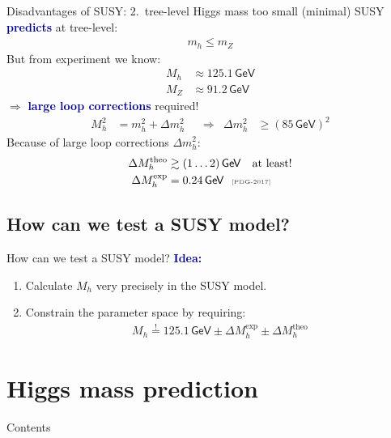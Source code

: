 \documentclass[hyperref={pdfpagelabels=false},ngerman]{beamer}
\newcommand{\eh}[1]{\,\mathsf{#1}}
\newcommand{\mycite}[1]{\ensuremath{\text{\textcolor{darkgray}{\tiny [#1]}}}}
\renewcommand{\emph}[1]{\textbf{\textcolor{darkblue}{#1}}}
\newcommand{\GeV}{\eh{GeV}}
\begin{document}
\begin{frame}{Disadvantages of SUSY: 2.\ tree-level Higgs mass too small}
  (minimal) SUSY \emph{predicts} at tree-level:
  \begin{align*}
    m_h \le m_Z
  \end{align*}
  But from experiment we know:
  \begin{align*}
    M_h &\approx 125.1 \GeV \\
    M_Z &\approx 91.2 \GeV
  \end{align*}
  $\Rightarrow$ \emph{large loop corrections} required!
  \begin{align*}
    M_h^2 &= m_h^2 + \Delta m_h^2
    & &\Rightarrow &
    \Delta m_h^2 &\geq (85\eh{GeV})^2
  \end{align*}
  Because of large loop corrections $\Delta m_h^2$:
  \begin{align*}
    \Delta M_h^{\text{theo}} &\gtrsim (1\ldots 2)\eh{GeV} \quad \text{at least!} \\
    \Delta M_h^{\text{exp}} &= 0.24\eh{GeV} \ \ \mycite{PDG-2017}
  \end{align*}
\end{frame}

\subsection{How can we test a SUSY model?}

\begin{frame}{How can we test a SUSY model?}
  \emph{Idea:}
  \begin{enumerate}
  \item Calculate $M_h$ very precisely in the SUSY model.
  \item Constrain the parameter space by requiring:
    \begin{align*}
      M_h \overset{!}{=} 125.1 \GeV \pm \Delta M_h^{\text{exp}} \pm \Delta M_h^{\text{theo}}
    \end{align*}
  \end{enumerate}
\end{frame}

\section{Higgs mass prediction}

\begin{frame}{Contents}
  \tableofcontents[currentsection]
\end{frame}
\end{document}
